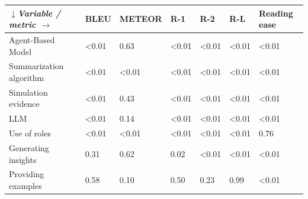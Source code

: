 \begin{tabular}{|l|l|l|l|l|l|l|}
\hline
\textit{$\downarrow$Variable / metric $\rightarrow$} & BLEU & METEOR & R-1 & R-2 & R-L & Reading ease \\
 \hline
 Agent-Based Model & \textless{}0.01 & 0.63 & \textless{}0.01 & \textless{}0.01 & \textless{}0.01 & \textless{}0.01 \\
 \hline
 Summarization algorithm & \textless{}0.01 & \textless{}0.01 & \textless{}0.01 & \textless{}0.01 & \textless{}0.01 & \textless{}0.01 \\
 \hline
 Simulation evidence & \textless{}0.01 & 0.43 & \textless{}0.01 & \textless{}0.01 & \textless{}0.01 & \textless{}0.01 \\
 \hline
 LLM & \textless{}0.01 & 0.14 & \textless{}0.01 & \textless{}0.01 & \textless{}0.01 & \textless{}0.01 \\
 \hline
 Use of roles & \textless{}0.01 & \textless{}0.01 & \textless{}0.01 & \textless{}0.01 & \textless{}0.01 & 0.76 \\
 \hline
 Generating insights & 0.31 & 0.62 & 0.02 & \textless{}0.01 & \textless{}0.01 & \textless{}0.01 \\
 \hline
 Providing examples & 0.58 & 0.10 & 0.50 & 0.23 & 0.99 & \textless{}0.01 \\
\hline
\end{tabular}
